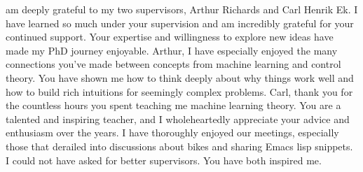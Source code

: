 \documentclass{mimosis-class/mimosis}
\numberwithin{equation}{chapter}
\begin{document}
\label{sec:org035fa97}
\begin{singlespace}
 am deeply grateful to my two supervisors, Arthur Richards and Carl Henrik Ek.
I have learned so much under your supervision and am incredibly grateful for your continued support.
Your expertise and willingness to explore new ideas have made my PhD journey enjoyable.
Arthur, I have especially enjoyed the many connections you've made between concepts from machine learning and control theory.
You have shown me how to think deeply about why things work well and how
to build rich intuitions for seemingly complex problems.
Carl, thank you for the countless hours you spent teaching me machine learning theory.
You are a talented and inspiring teacher, and I wholeheartedly appreciate your advice and enthusiasm over the years.
I have thoroughly enjoyed our meetings, especially those that derailed into discussions about bikes
and sharing Emacs lisp snippets.
I could not have asked for better supervisors.
You have both inspired me.








\end{singlespace}
\end{document}
